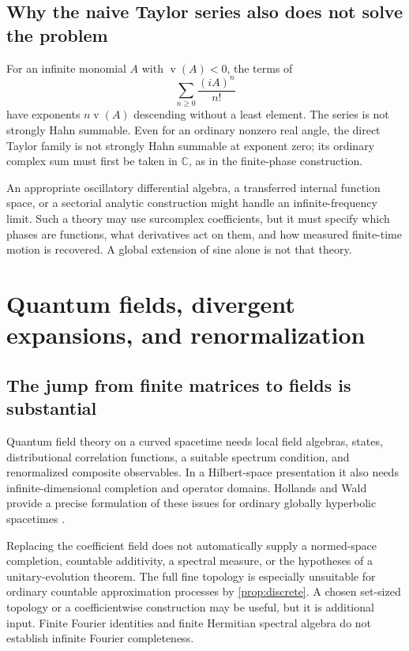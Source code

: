 \documentclass[11pt,a4paper]{article}
\numberwithin{equation}{section}
\theoremstyle{definition}
\theoremstyle{remark}
\newcommand{\C}{\mathbb C}
\newcommand{\val}{\operatorname{v}}
\begin{document}
\subsection{Why the naive Taylor series also does not solve the problem}
For an infinite monomial $A$ with $\val(A)<0$, the terms of
\[
\sum_{n\ge0}\frac{(iA)^n}{n!}
\]
have exponents $n\val(A)$ descending without a least element. The series is
not strongly Hahn summable. Even for an ordinary nonzero real angle, the direct
Taylor family is not strongly Hahn summable at exponent zero; its ordinary
complex sum must first be taken in $\C$, as in the finite-phase construction.

An appropriate oscillatory differential algebra, a transferred internal
function space, or a sectorial analytic construction might handle an
infinite-frequency limit. Such a theory may use surcomplex coefficients, but
it must specify which phases are functions, what derivatives act on them, and
how measured finite-time motion is recovered. A global extension of sine alone
is not that theory.

\section{Quantum fields, divergent expansions, and renormalization}\label{sec:qft}

\subsection{The jump from finite matrices to fields is substantial}
Quantum field theory on a curved spacetime needs local field algebras, states,
distributional correlation functions, a suitable spectrum condition, and
renormalized composite observables. In a Hilbert-space presentation it also
needs infinite-dimensional completion and operator domains. Hollands and Wald
provide a precise formulation of these issues for ordinary globally hyperbolic
spacetimes \cite{HW}.

Replacing the coefficient field does not automatically supply a normed-space
completion, countable additivity, a spectral measure, or the hypotheses of a
unitary-evolution theorem. The full fine topology is especially unsuitable for
ordinary countable approximation processes by \cref{prop:discrete}. A chosen
set-sized topology or a coefficientwise construction may be useful, but it is
additional input. Finite Fourier identities and finite Hermitian spectral
algebra do not establish infinite Fourier completeness.
\end{document}
